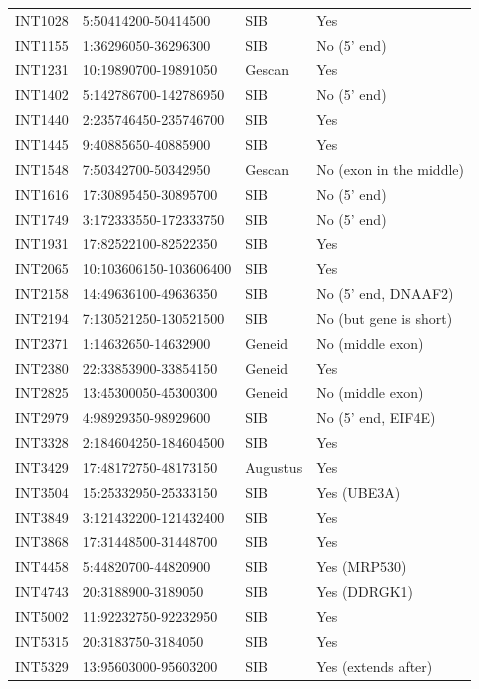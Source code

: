 \begin{table}[h]
\begin{tabular}{llll}
	INT1028 & 5:50414200-50414500 & SIB & Yes \\
	INT1155 & 1:36296050-36296300 & SIB & No (5' end) \\
	INT1231 & 10:19890700-19891050 & Gescan & Yes \\
	INT1402 & 5:142786700-142786950 & SIB & No (5' end) \\
	INT1440 & 2:235746450-235746700 & SIB & Yes \\
	INT1445 & 9:40885650-40885900 & SIB & Yes \\
	INT1548 & 7:50342700-50342950 & Gescan & No (exon in the middle) \\
	INT1616 & 17:30895450-30895700 & SIB & No (5' end) \\
	INT1749 & 3:172333550-172333750 & SIB & No (5' end) \\
	INT1931 & 17:82522100-82522350 & SIB & Yes \\
	INT2065 & 10:103606150-103606400 & SIB & Yes \\
	INT2158 & 14:49636100-49636350 & SIB & No (5' end, DNAAF2) \\
	INT2194 & 7:130521250-130521500 & SIB & No (but gene is short) \\
	INT2371 & 1:14632650-14632900 & Geneid & No (middle exon) \\
	INT2380 & 22:33853900-33854150 & Geneid & Yes \\
	INT2825 & 13:45300050-45300300 & Geneid & No (middle exon) \\
	INT2979 & 4:98929350-98929600 & SIB & No (5' end, EIF4E) \\
	INT3328 & 2:184604250-184604500 & SIB & Yes \\
	INT3429 & 17:48172750-48173150 & Augustus & Yes \\
	INT3504 & 15:25332950-25333150 & SIB & Yes (UBE3A) \\
	INT3849 & 3:121432200-121432400 & SIB & Yes \\
	INT3868 & 17:31448500-31448700 & SIB & Yes \\
	INT4458 & 5:44820700-44820900 & SIB & Yes (MRP530) \\
	INT4743 & 20:3188900-3189050 & SIB & Yes (DDRGK1) \\
	INT5002 & 11:92232750-92232950 & SIB & Yes \\
	INT5315 & 20:3183750-3184050 & SIB & Yes \\
	INT5329 & 13:95603000-95603200 & SIB & Yes (extends after) \\
        \bottomrule
    \end{tabular}
\end{table}

%
